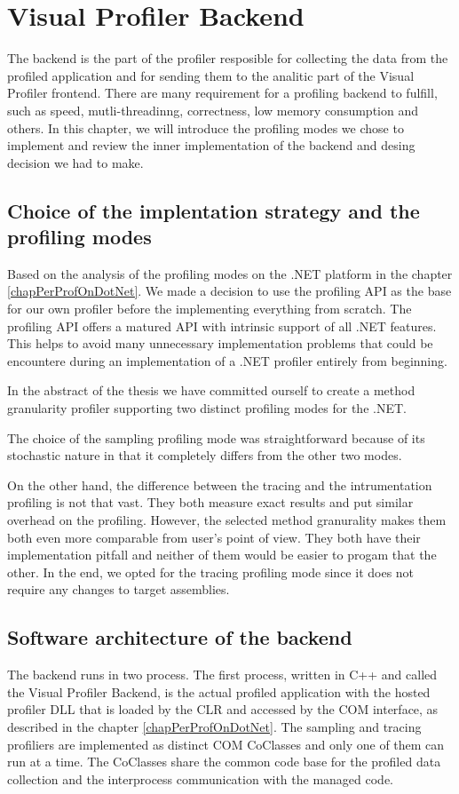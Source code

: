 \chapter{Visual Profiler Backend}
The backend is the part of the profiler resposible for collecting the data from the profiled application and for sending them to the analitic part of the Visual Profiler frontend. There are many requirement for a profiling backend to fulfill, such as speed, mutli-threadinng, correctness, low memory consumption and others. In this chapter, we will introduce the profiling modes we chose to implement and review the inner implementation of the backend and desing decision we had to make.

\section{Choice of the implentation strategy and the profiling modes}
Based on the analysis of the profiling modes on the .NET platform in the chapter \ref{chapPerProfOnDotNet}. We made a decision to use the profiling API as the base for our own profiler before the implementing everything from scratch. The profiling API offers a 	 matured API with intrinsic support of all .NET features. This helps to avoid many unnecessary implementation problems that could be encountere during an implementation of a .NET profiler entirely from beginning.

In the abstract of the thesis we have committed ourself to create a method granularity profiler supporting two distinct profiling modes for the .NET.

The choice of the sampling profiling mode was straightforward because of its stochastic nature in that it completely differs from the other two modes. 

On the other hand, the difference between the tracing and the intrumentation profiling is not that vast. They both measure exact results and put similar overhead on the profiling. However, the selected method granurality makes them both even more comparable from user's point of view. They both have their implementation pitfall and neither of them would be easier to progam that the other. In the end, we opted for the tracing profiling mode since it does not require any changes to target assemblies.

\section{Software architecture of the backend }
The backend runs in two process. The first process, written in C++ and called the Visual Profiler Backend, is the actual profiled application with the hosted profiler DLL that is loaded by the CLR and accessed by the COM interface, as described in the chapter \ref{chapPerProfOnDotNet}. The sampling and tracing profiliers are implemented as distinct COM CoClasses and only one of them can run at a time. The CoClasses share the common code base for the profiled data collection and the interprocess communication with the managed code.

